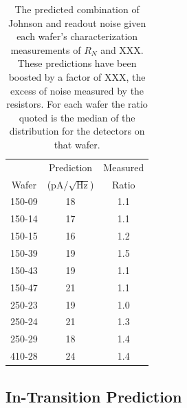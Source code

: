 \begin{table}[ht!]
\begin{center}
\begin{tabular}{| c | c | c |}
\hline  
           & Prediction           & Measured   \\
Wafer & (pA/$\sqrt{\mathrm{Hz}}$) & Ratio  \\
\hline 150-09 & 18 &  1.1 \\ 
\hline 150-14 & 17 &  1.1 \\ 
\hline 150-15 & 16 &  1.2 \\ 
\hline 150-39 & 19 &  1.5 \\ 
\hline 150-43 & 19 &  1.1 \\
\hline 150-47 & 21 &  1.1 \\
\hline 250-23 & 19 &  1.0 \\ 
\hline 250-24 & 21 &  1.3 \\ 
\hline 250-29 & 18 &  1.4 \\
\hline 410-28 & 24 &  1.4 \\
\hline
\end{tabular}
\end{center}
\caption{The predicted combination of Johnson and readout noise given each wafer's characterization measurements of $R_{N}$ and XXX. These predictions have been boosted by a factor of XXX, the excess of noise measured by the resistors. For each wafer the ratio quoted is  the median of the distribution for the detectors on that wafer. 
\label{tab:overbias_noise_table} }
\end{table}

\subsection{In-Transition Prediction}
\label{sec:in_trans_pred}


